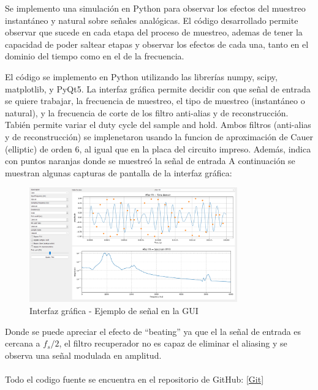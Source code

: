 Se implemento una simulación en Python para observar los efectos del muestreo
instantáneo y natural sobre señales analógicas. El código desarrollado permite
observar que sucede en cada etapa del proceso de muestreo, ademas de tener
la capacidad de poder saltear etapas y observar los efectos de cada una, tanto 
en el dominio del tiempo como en el de la frecuencia.

El código se implemento en Python utilizando las librerías numpy, scipy, matplotlib,
y PyQt5. La interfaz gráfica permite decidir con que señal de entrada se quiere
trabajar, la frecuencia de muestreo, el tipo de muestreo (instantáneo o natural),
y la frecuencia de corte de los filtro anti-alias y de reconstrucción.
Tabién permite variar el duty cycle del sample and hold.
Ambos filtros (anti-alias y de reconstrucción) se implenetaron
usando la funcion de aproximación de Cauer (elliptic) de orden 6,
al igual que en la placa del circuito impreso.
Además, indica con puntos naranjas donde se muestreó la señal de entrada
A continuación se muestran algunas capturas de pantalla de la interfaz gráfica:

\begin{figure}[H]
    \centering
    \includegraphics[width=0.8\textwidth]{Imagenes/gui_beating.png}
    \caption{Interfaz gráfica - Ejemplo de señal en la GUI}
    \label{fig:interfaz1}
\end{figure}

Donde se puede apreciar el efecto de ``beating'' ya que el la señal de entrada
es cercana a $f_s/2$, el filtro recuperador no es capaz de eliminar el aliasing
y se observa una señal modulada en amplitud.
\\\\Todo el codigo fuente se encuentra en el repositorio de GitHub: \ref{Git}

